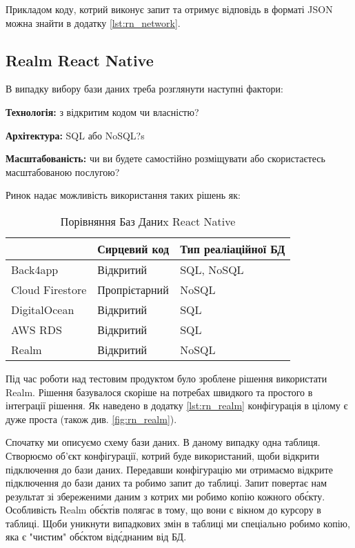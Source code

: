 Прикладом коду, котрий виконує запит та отримує відповідь в форматі JSON можна знайти в додатку \ref{lst:rn_network}.

\subsection{Realm React Native}
\label{subsec:rn_realm}
В випадку вибору бази даних треба розглянути наступні фактори:
\begin{itemize}
    \begin{item}
        \textbf{Технологія:} з відкритим кодом чи власністю?
    \end{item}
    \begin{item}
        \textbf{Архітектура:} SQL або NoSQL?s
    \end{item}
    \begin{item}
        \textbf{Масштабованість:} чи ви будете самостійно розміщувати або скористаєтесь масштабованою послугою?
    \end{item}
\end{itemize}

Ринок надає можливість використання таких рішень як:

\begin{longtable}[c]{|l|l|l|}
    \caption{Порівняння Баз Даниx React Native}
    \label{tab:rn_db_comparison} \\
    \hline
    & Сирцевий код  & Тип реаліаційної БД \\ \hline
    \endhead
%
    Back4app        & Відкритий     & SQL, NoSQL          \\ \hline
    Cloud Firestore & Пропрієтарний & NoSQL               \\ \hline
    DigitalOcean    & Відкритий     & SQL                 \\ \hline
    AWS RDS         & Відкритий     & SQL                 \\ \hline
    Realm           & Відкритий     & NoSQL               \\ \hline
\end{longtable}

Під час роботи над тестовим продуктом було зроблене рішення використати Realm.
Рішення базувалося скоріше на потребах швидкого та простого в інтеграції рішення.
Як наведено в додатку \ref{lst:rn_realm}  конфігурація в цілому є дуже проста (також див. \ref{fig:rn_realm}).

Спочатку ми описуємо схему бази даних. В даному випадку одна таблиця.
Створюємо об'єкт конфігурації, котрий буде використаний, щоби відкрити підключення до бази даних.
Передавши конфігурацію ми отримаємо відкрите підключення до бази даних та робимо запит до таблиці.
Запит повертає нам результат зі збереженими даним з котрих ми робимо копію кожного об\'єкту.
Особливість Realm об\'єктів полягає в тому, що вони є вікном до курсору в таблиці.
Щоби уникнути випадкових змін в таблиці ми спеціально робимо копію, яка є "чистим" об\'єктом від\'єднаним від БД.

